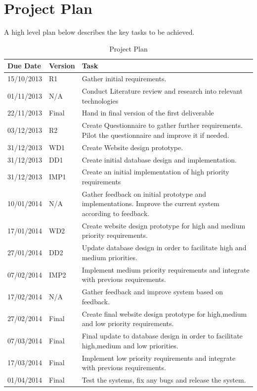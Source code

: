 \documentclass[a4paper,oneside,11pt]{report}
\begin{document}
\chapter{Project Plan}
A high level plan below describes the key tasks to be achieved.
\begin{center}
	\begin{table}[!ht]
    \begin{tabular}[ht]{| l | l | p{11cm} |}
    \hline
    Due Date & Version & Task \\ 
    \hline
    15/10/2013 & R1 & Gather initial requirements.\\ 
    \hline
    01/11/2013 & N/A & Conduct Literature review and research into relevant 												  technologies \\ 
    \hline
    22/11/2013 & Final & Hand in final version of the first deliverable \\ 
    \hline
    03/12/2013 & R2 & Create Questionnaire to gather further requirements. Pilot the 										questionnaire and improve it if needed.\\ 
    \hline
    31/12/2013 & WD1 & Create Website design prototype.\\
    \hline
    31/12/2013 & DD1 & Create initial database design and implementation.\\
    \hline
    31/12/2013 & IMP1 & Create an initial implementation of high priority requirements\\
    \hline
    10/01/2014 & N/A & Gather feedback on initial prototype and implementations. Improve 	                  				   the current system according to feedback.\\
    \hline
     17/01/2014 & WD2 & Create website design prototype for high and medium priority 										  requirements.\\
    \hline
    27/01/2014 & DD2 & Update database design in order to facilitate high and medium 		 								 priorities.\\
    \hline
    07/02/2014 & IMP2 & Implement medium priority requirements and integrate with previous requirements.		\\
    \hline
    17/02/2014 & N/A & Gather feedback and improve system based on feedback.\\
    \hline
    27/02/2014 & Final & Create final website design prototype for high,medium and low priority 			 			 requirements.\\
    \hline
    07/03/2014 & Final & Final update to database design in order to facilitate high,medium and low		 		             priorities.\\
    \hline
    17/03/2014 & Final & Implement low priority requirements and integrate with previous requirements.\\
    \hline
    01/04/2014 & Final & Test the systems, fix any bugs and release the system.\\
    \hline
    \end{tabular}
    \caption{Project Plan}
\label{tab:test}
    \end{table}
    \end{center}

\printbibliography
\end{document}
